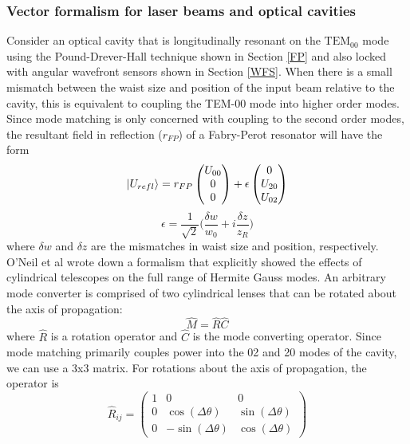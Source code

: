 \subsubsection{Vector formalism for laser beams and optical cavities}
	Consider an optical cavity that is longitudinally resonant on the $\text{TEM}_{00}$ mode using the Pound-Drever-Hall technique shown in Section \ref{FP} and also locked with angular wavefront sensors shown in Section \ref{WFS}. When there is a small mismatch between the waist size and position of the input beam relative to the cavity, this is equivalent to coupling the TEM-00 mode into higher order modes.  Since mode matching is only concerned with coupling to the second order modes, the  resultant field in reflection ($r_{FP}$) of a Fabry-Perot resonator will have the form
	\begin{equation}\label{MMVector}
	\ket{U_{refl}} = r_{FP} \begin{pmatrix} U_{00}
	\\ 0
	\\ 0
	\end{pmatrix}
		+
	\epsilon \begin{pmatrix} 0
	\\ U_{20}
	\\ U_{02}
	\end{pmatrix}
	\end{equation}
\begin{equation}
\epsilon = \frac{1}{\sqrt{2}} \bigg(\frac{\delta w}{w_0} + i \frac{\delta z}{z_R}\bigg)
\end{equation}
where $\delta w$ and $\delta z$ are the mismatches in waist size and position, respectively.  O'Neil et al \cite{ONeilModeTransform} wrote down a formalism that explicitly showed the effects of cylindrical telescopes on the full range of Hermite Gauss modes. An arbitrary mode converter is comprised of two cylindrical lenses that can be rotated about the axis of propagation:
	\begin{equation}
	\hat{M} = \hat{R} \hat{C}
	\end{equation} 
where $\hat{R}$ is a rotation operator and $\hat{C}$ is the mode converting operator.  Since mode matching primarily couples power into the 02 and 20 modes of the cavity, we can use a 3x3 matrix.  For rotations about the axis of propagation, the operator is
\begin{equation} \label{rotation}
\hat{R}_{ij} = 
\begin{pmatrix}
1		&0										& 0 
\\ 	0		&\cos(\Delta \theta)						&\sin(\Delta \theta)
\\ 	0		&-\sin(\Delta \theta)						&\cos(\Delta \theta)			

\end{pmatrix}
\end{equation}
